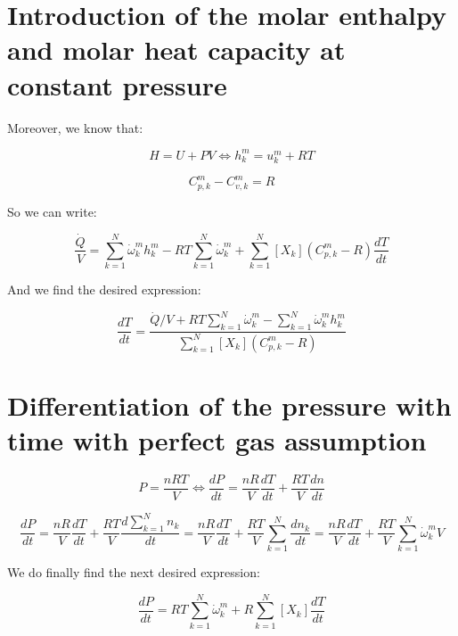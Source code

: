 \documentclass[11pt, a4paper]{article} %
\begin{document}
\section{Introduction of the molar enthalpy and molar heat capacity at constant pressure}

Moreover, we know that:

\begin{equation}
    H = U + PV \iff h_k^m = u_k^m + RT
\end{equation}

\begin{equation}
    C_{p,k}^m - C_{v,k}^m = R
\end{equation}

So we can write:

\begin{equation}
    \frac{\dot{Q}}{V} = \sum_{k=1}^{N} \dot{\omega}_k^m h_k^m - RT \sum_{k=1}^{N} \dot{\omega}_k^m + \sum_{k=1}^{N} \left[ X_k \right] \left( C_{p,k}^m - R \right) \frac{dT}{dt}
\end{equation}

And we find the desired expression:


\begin{equation}
    \boxed{
        \frac{dT}{dt} = \frac{\dot{Q}/V + RT \sum_{k=1}^{N} \dot{\omega}_k^m - \sum_{k=1}^{N} \dot{\omega}_k^m h_k^m}{\sum_{k=1}^{N} \left[ X_k \right] \left( C_{p,k}^m - R \right)}
    }
\end{equation}


\section{Differentiation of the pressure with time with perfect gas assumption}

\begin{equation}
    P = \frac{nRT}{V}
    \iff
    \frac{dP}{dt} = \frac{nR}{V} \frac{dT}{dt} + \frac{RT}{V} \frac{d n }{dt}
\end{equation}

\begin{equation}
    \frac{dP}{dt} = \frac{nR}{V} \frac{dT}{dt} + \frac{RT}{V} \frac{d \sum_{k=1}^{N} n_k }{dt} = \frac{nR}{V} \frac{dT}{dt} + \frac{RT}{V} \sum_{k=1}^{N} \frac{d n_k }{dt} = \frac{nR}{V} \frac{dT}{dt} + \frac{RT}{V} \sum_{k=1}^{N} \dot{\omega}_k^m V
\end{equation}

We do finally find the next desired expression:

\begin{equation}
    \boxed{
        \frac{dP}{dt} = RT \sum_{k=1}^{N} \dot{\omega}_k^m + R \sum_{k=1}^{N} \left[ X_k \right] \frac{dT}{dt}
    }
\end{equation}
\end{document}
